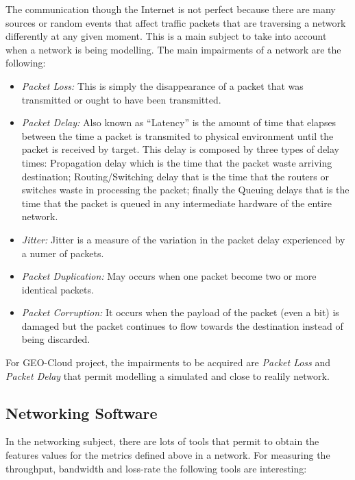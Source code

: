 The communication though the Internet is not perfect because there are many
sources or random events that affect traffic packets that are traversing a
network differently at any given moment. This is a main
subject to take into account when a network is being modelling. The main
impairments
 of a network are the following:

\begin{itemize}
\item \emph{Packet Loss:} This is simply the disappearance of a packet that was
  transmitted or ought to have been transmitted.
\item \emph{Packet Delay:} Also known as ``Latency'' is the amount of time that elapses between the time a
  packet is transmited to physical environment until the packet is received by
  target. This delay is composed by three types of delay times: Propagation
  delay which is the time that the packet waste arriving destination;
  Routing/Switching delay that is the time that the routers or
  switches waste in processing the packet; finally the Queuing delays that is
  the time that the packet is queued in any intermediate hardware of the entire network.
\item \emph{Jitter:} Jitter is a measure of the variation in the packet delay
  experienced by a numer of packets. 
\item \emph{Packet Duplication:} May occurs when one packet become two or more
  identical packets.
\item \emph{Packet Corruption:} It occurs when the payload of the packet (even a bit)
  is damaged but the packet continues to flow towards the destination instead of
  being discarded.
\end{itemize}

For GEO-Cloud project, the impairments to be acquired are \emph{Packet Loss} and
\emph{Packet Delay} that permit modelling a simulated and close to realily network.


\subsection{Networking Software}

In the networking subject, there are lots of tools that permit to obtain the
features values for the metrics defined above in a network. 
For measuring the throughput, bandwidth and loss-rate the following tools are interesting:

